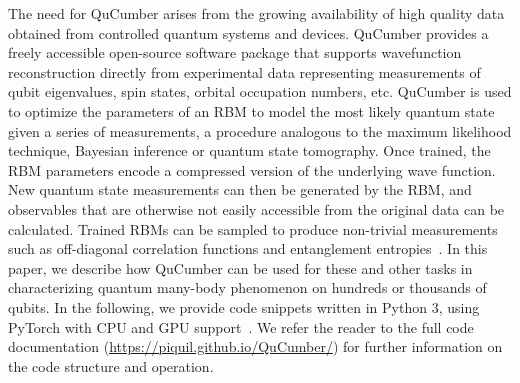\documentclass[submission, Phys]{SciPost}
\begin{document}
The need for QuCumber arises from the growing availability of high quality data obtained from controlled quantum
systems and devices.
QuCumber provides a freely accessible open-source software package that supports wavefunction reconstruction directly from experimental data representing measurements of qubit eigenvalues, spin states, orbital occupation numbers, etc.
QuCumber is used to optimize the parameters of an RBM to model the most likely quantum state given a series of measurements,
a procedure analogous to the maximum likelihood technique, Bayesian inference or quantum state tomography. 
Once trained, the RBM parameters encode a compressed version of the underlying wave function.
New quantum state measurements can then be generated by the RBM, and observables that are otherwise not easily accessible from the original data can be calculated. 
Trained RBMs can be sampled to produce non-trivial measurements such as off-diagonal correlation functions and entanglement entropies~\cite{Torlai2016thermo, torlai2018tomography}.
In this paper, we describe how QuCumber can be used for these and other tasks in characterizing quantum many-body phenomenon on hundreds or thousands of qubits.
In the following, we provide code snippets written in Python 3, using PyTorch with CPU and GPU support~\cite{paszke2017automatic}.
We refer the reader to the full code documentation (\url{https://piquil.github.io/QuCumber/}) for further information on the code structure and operation.



\end{document}
